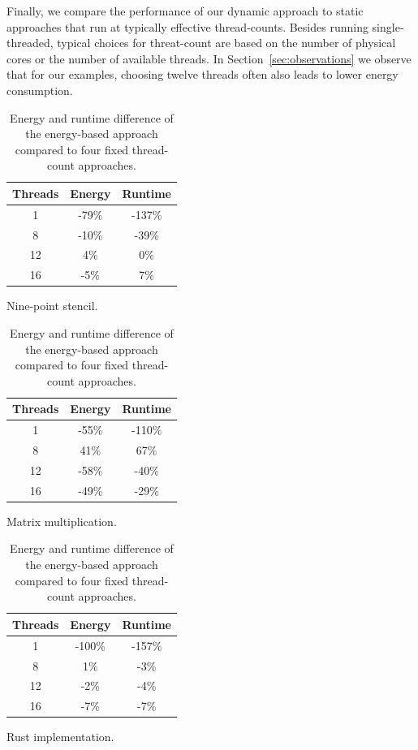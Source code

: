 Finally, we compare the performance of our dynamic approach to static approaches that run at typically effective thread-counts.
Besides running single-threaded, typical choices for threat-count are based on the number of physical cores or the number of available threads.
In Section~\ref{sec:observations} we observe that for our examples, choosing twelve threads often also leads to lower energy consumption.

\begin{table}[ht]
    \centering
    \begin{subtable}{0.33\linewidth}
        \centering
        \begin{tabular}{ccc}\hline
            Threads & Energy & Runtime \\\hline
            1       &  -79\% &  -137\% \\
            8       &  -10\% &   -39\% \\
            12      &    4\% &     0\% \\
            16      &   -5\% &     7\% \\\hline
        \end{tabular}
        \caption{Nine-point stencil.}
        \label{tab:static-stencil}
    \end{subtable}%
    \begin{subtable}{0.33\linewidth}
        \centering
        \begin{tabular}{ccc}\hline
            Threads & Energy & Runtime \\\hline
            1       &  -55\% &  -110\% \\
            8       &   41\% &    67\% \\
            12      &  -58\% &   -40\% \\
            16      &  -49\% &   -29\% \\\hline
        \end{tabular}
        \caption{Matrix multiplication.}
        \label{tab:static-matmul}
    \end{subtable}%
    \begin{subtable}{0.33\linewidth}
        \centering
        \begin{tabular}{ccc}\hline
            Threads & Energy & Runtime \\\hline
            1       & -100\% &  -157\% \\
            8       &    1\% &    -3\% \\
            12      &   -2\% &    -4\% \\
            16      &   -7\% &    -7\% \\\hline
        \end{tabular}
        \caption{Rust implementation.}
        \label{tab:static-rust}
    \end{subtable}%
    \caption{Energy and runtime difference of the energy-based approach compared to four fixed thread-count approaches.}
    \label{fig:static}
\end{table}

